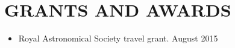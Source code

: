 \section{GRANTS AND AWARDS}
\begin{itemize}
\item Royal Astronomical Society travel grant. \hfill August 2015
\end{itemize}
